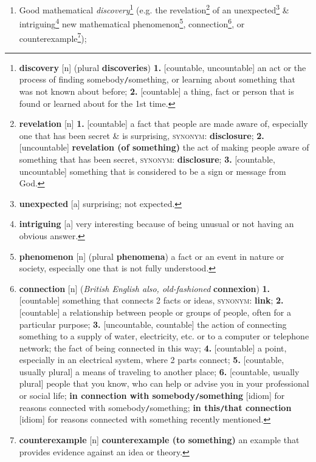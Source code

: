 \documentclass[oneside]{book}
\numberwithin{equation}{section}
\begin{document}
\begin{enumerate}
	\item Good mathematical \textit{discovery}\footnote{\textbf{discovery} [n] (plural \textbf{discoveries}) \textbf{1.} [countable, uncountable] an act or the process of finding somebody\texttt{/}something, or learning about something that was not known about before; \textbf{2.} [countable] a thing, fact or person that is found or learned about for the 1st time.} (e.g. the revelation\footnote{\textbf{revelation} [n] \textbf{1.} [countable] a fact that people are made aware of, especially one that has been secret \& is surprising, \textsc{synonym}: \textbf{disclosure}; \textbf{2.} [uncountable] \textbf{revelation (of something)} the act of making people aware of something that has been secret, \textsc{synonym}: \textbf{disclosure}; \textbf{3.} [countable, uncountable] something that is considered to be a sign or message from God.} of an unexpected\footnote{\textbf{unexpected} [a] surprising; not expected.} \& intriguing\footnote{\textbf{intriguing} [a] very interesting because of being unusual or not having an obvious answer.} new mathematical phenomenon\footnote{\textbf{phenomenon} [n] (plural \textbf{phenomena}) a fact or an event in nature or society, especially one that is not fully understood.}, connection\footnote{\textbf{connection} [n] (\textit{British English also, old-fashioned} \textbf{connexion}) \textbf{1.} [countable] something that connects 2 facts or ideas, \textsc{synonym}: \textbf{link}; \textbf{2.} [countable] a relationship between people or groups of people, often for a particular purpose; \textbf{3.} [uncountable, countable] the action of connecting something to a supply of water, electricity, etc. or to a computer or telephone network; the fact of being connected in this way; \textbf{4.} [countable] a point, especially in an electrical system, where 2 parts connect; \textbf{5.} [countable, usually plural] a means of traveling to another place; \textbf{6.} [countable, usually plural] people that you know, who can help or advise you in your professional or social life; \textbf{in connection with somebody\texttt{/}something} [idiom] for reasons connected with somebody\texttt{/}something; \textbf{in this\texttt{/}that connection} [idiom] for reasons connected with something recently mentioned.}, or counterexample\footnote{\textbf{counterexample} [n] \textbf{counterexample (to something)} an example that provides evidence against an idea or theory.});

\end{enumerate}
\end{document}
